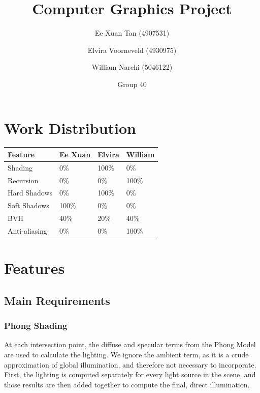 \documentclass{article}
\author{Ee Xuan Tan (4907531) \and Elvira Voorneveld (4930975) \and William Narchi (5046122)}
\date{Group 40} %
\title{Computer Graphics Project}
\begin{document}
    \maketitle

    \section{Work Distribution}
    
    \begin{tabular}{ |p{2.5cm}||p{2.5cm}|p{2.5cm}|p{2.5cm}| }
        \hline
        \textbf{Feature} &\textbf{Ee Xuan} &\textbf{Elvira} &\textbf{William}\\
        \hline
        Shading         &0\%    &100\%  &0\%\\
        Recursion       &0\%    &0\%    &100\%\\
        Hard Shadows    &0\%    &100\%  &0\%\\
        Soft Shadows    &100\%  &0\%    &0\%\\
        BVH             &40\%  &20\%    &40\%\\
        Anti-aliasing   &0\%    &0\%    &100\%\\
        \hline
    \end{tabular}

    \section{Features}
    \subsection{Main Requirements}
    \subsubsection{Phong Shading}
    At each intersection point, the diffuse and specular terms from the Phong Model are used to calculate the lighting.
    We ignore the ambient term, as it is a crude approximation of global illumination, and therefore not necessary to incorporate.
    First, the lighting is computed separately for every light source in the scene, 
    and those results are then added together to compute the final, direct illumination.
\end{document}

